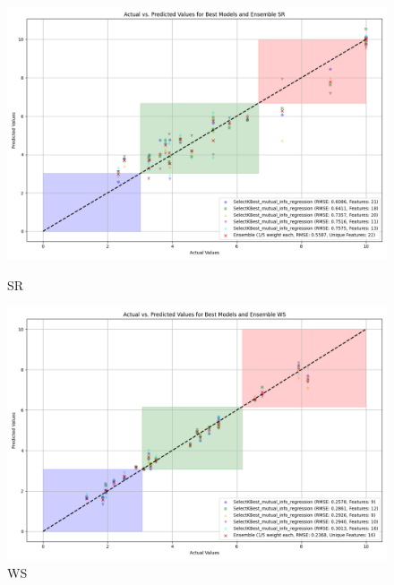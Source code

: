 \begin{figure}[H]
    \centering
    \begin{minipage}{0.45\textwidth}
        \centering
        \includegraphics[width=\linewidth]{reg_section_specxtra/images_reg_featred_ensemble/actual_vs_predicted_best_feature_selection_and_ensemble_SR.png}
        \caption{SR}
        \label{fig_reg_specxtra:sr_reg_featred_best_ensemble}
    \end{minipage}\hfill
    \begin{minipage}{0.45\textwidth}
        \centering
        \includegraphics[width=\linewidth]{reg_section_specxtra/images_reg_featred_ensemble/actual_vs_predicted_best_feature_selection_and_ensemble_WS.png}
        \caption{WS}
        \label{fig_reg_specxtra:ws_reg_featred_best_ensemble}
    \end{minipage}
\end{figure}

